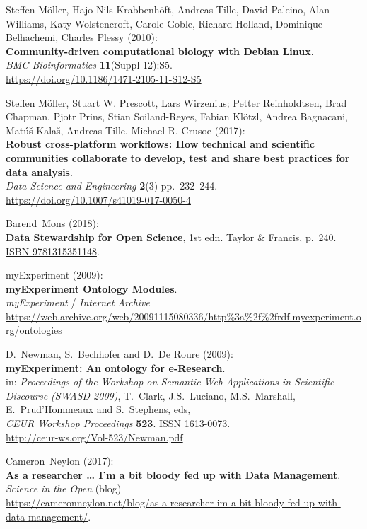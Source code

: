 \begin{thebibliography}{9}
Steffen Möller, Hajo Nils Krabbenhöft, Andreas Tille, David
Paleino, Alan Williams, Katy Wolstencroft, Carole Goble, Richard
Holland, Dominique Belhachemi, Charles Plessy (2010):\\
\textbf{Community-driven computational biology with Debian Linux}.\\
\emph{BMC Bioinformatics} \textbf{11}(Suppl 12):S5.\\
\url{https://doi.org/10.1186/1471-2105-11-S12-S5}

Steffen Möller, Stuart W. Prescott, Lars Wirzenius; Petter
Reinholdtsen, Brad Chapman, Pjotr Prins, Stian Soiland-Reyes, Fabian
Klötzl, Andrea Bagnacani, Matúš Kalaš, Andreas Tille, Michael R. Crusoe
(2017):\\
\textbf{Robust cross-platform workflows: How technical and scientific
communities collaborate to develop, test and share best practices for
data analysis}.\\
\emph{Data Science and Engineering} \textbf{2}(3) pp.~232--244.\\
\url{https://doi.org/10.1007/s41019-017-0050-4}

Barend~Mons (2018):\\
\textbf{Data Stewardship for Open Science}, 1st edn. Taylor \& Francis,
p.~240. \href{https://identifiers.org/isbn/9781315351148}{ISBN
9781315351148}.

myExperiment (2009):\\
\textbf{myExperiment Ontology Modules}.\\
\emph{myExperiment} / \emph{Internet Archive}\\
\url{https://web.archive.org/web/20091115080336/http\%3a\%2f\%2frdf.myexperiment.org/ontologies}

D.~Newman, S.~Bechhofer and D.~De Roure (2009):\\
\textbf{myExperiment: An ontology for e-Research}.\\
in: \emph{Proceedings of the Workshop on Semantic Web Applications in
Scientific Discourse (SWASD 2009)}, T.~Clark, J.S.~Luciano,
M.S.~Marshall, E.~Prud'Hommeaux and S.~Stephens, eds,\\
\emph{CEUR Workshop Proceedings} \textbf{523}. ISSN 1613-0073.\\
\url{http://ceur-ws.org/Vol-523/Newman.pdf}

Cameron~Neylon (2017):\\
\textbf{As a researcher \ldots{} I'm a bit bloody fed up with Data
Management}.\\
\emph{Science in the Open} (blog)\\
\url{https://cameronneylon.net/blog/as-a-researcher-im-a-bit-bloody-fed-up-with-data-management/}.


\end{thebibliography}

